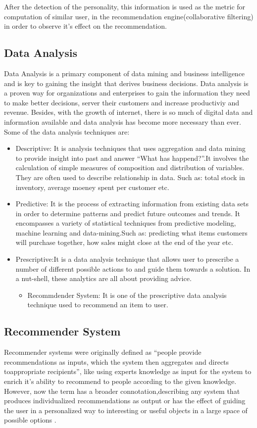 After the detection of the personality, this information is used as the metric for computation of similar user, in the recommendation engine(collaborative filtering) in order to observe it's effect on the recommendation.

\subsection{Data Analysis}
Data Analysis \cite{analysis} is a primary component of data mining and business intelligence and is key to gaining the insight that derives business decisions. Data analysis is a proven way for organizations and enterprises to gain the information they need to make better decisions, server their customers and increase productiviy and revenue. Besides, with the growth of internet, there is so much of digital data and information available and data analysis has become more necessary than ever. 
Some of the data analysis techniques are:
\begin{itemize}
	\item Descriptive: It is analysis techniques that uses aggregation and data mining to provide insight into past and answer ``What has happend?''.It involves the calculation of simple measures of composition and distribution of variables. They are often used to describe relationship in data. Such as: total stock in inventory, average moeney spent per customer etc.
	\item Predictive: It is the process of extracting information from existing data sets in order to determine patterns and predict future outcomes and trends. It encompasses a variety of statistical techniques from predictive modeling, machine learning and data-mining.Such as: predicting what items customers will purchase together, how sales might close at the end of the year etc.
	\item Prescriptive:It is a data analysis technique that allows user to prescribe a number of different possible actions to and guide them towards a solution. In a nut-shell, these analytics are all about providing advice.
		\begin{itemize}
			\item Recommdender System: It is one of the prescriptive data analysis technique used to recommend an item to user.
		\end{itemize}
	\end{itemize}
\subsection{Recommender System}
Recommender systems were originally defined as ``people provide recommendations as inputs, which the system then aggregates and directs toappropriate recipients'', like using experts knowledge as input for the system to enrich it's ability to recommend to people according to the given knowledge. However, now the term has a broader connotation,describing any system that produces individualized recommendations as output or has the effect of guiding the user in a personalized way to interesting or useful objects in a large space of possible options \cite{rdef}.

